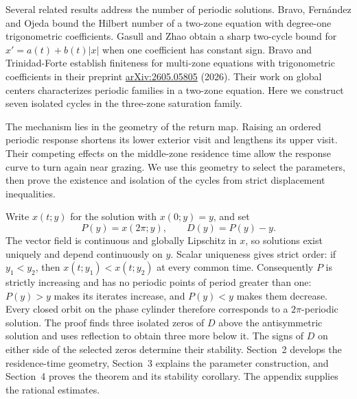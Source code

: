 \documentclass[11pt,a4paper]{article}
\begin{document}
Several related results address the number of periodic solutions.
Bravo, Fern\'andez and Ojeda \cite{Bravo2024} bound the Hilbert number
of a two-zone equation with degree-one trigonometric coefficients.
Gasull and Zhao \cite{Gasull2023} obtain a sharp two-cycle bound for
$x'=a(t)+b(t)|x|$ when one coefficient has constant sign.
Bravo and Trinidad-Forte establish finiteness for multi-zone equations
with trigonometric coefficients in their preprint
\href{https://arxiv.org/abs/2605.05805}{arXiv:2605.05805} (2026). Their work on
global centers \cite{Centers2026} characterizes periodic families in a
two-zone equation. Here we construct seven isolated cycles in the
three-zone saturation family.

The mechanism lies in the geometry of the return map. Raising an
ordered periodic response shortens its lower exterior visit and
lengthens its upper visit. Their competing effects on the middle-zone
residence time allow the response curve to turn again near grazing.
We use this geometry to select the parameters, then prove the existence
and isolation of the cycles from strict displacement inequalities.

Write $x(t;y)$ for the solution with $x(0;y)=y$, and set
\begin{equation}\label{eq:map}
 P(y)=x(2\pi;y),\qquad D(y)=P(y)-y.
\end{equation}
The vector field is continuous and globally Lipschitz in $x$, so solutions
exist uniquely and depend continuously on $y$. Scalar uniqueness gives
strict order: if $y_1<y_2$, then $x(t;y_1)<x(t;y_2)$ at every common time.
Consequently $P$ is strictly increasing and has no periodic points
of period greater than one: $P(y)>y$ makes its iterates increase,
and $P(y)<y$ makes them decrease. Every closed orbit on the phase
cylinder therefore corresponds to a $2\pi$-periodic solution.
The proof finds three isolated zeros of $D$ above the antisymmetric
solution and uses reflection to obtain three more below it.
The signs of $D$ on either side of the selected zeros determine their
stability. Section~2 develops the residence-time geometry, Section~3
explains the parameter construction, and Section~4 proves the theorem
and its stability corollary. The appendix supplies the rational estimates.
\end{document}
